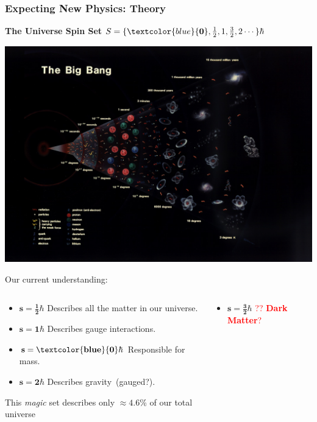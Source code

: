 \documentclass{beamer}
\begin{document}
\begin{frame}
\frametitle{Expecting New Physics: Theory}
  \begin{minipage}[b]{0.75\linewidth}
    \begin{multicols}{2}
     \begin{varblock}[3.5cm]{\textbf{The Universe  Spin Set}}
     \huge{
       $S =\{\textcolor{blue}{\mathbf{0}}, \frac{1}{2}, 1,  \frac{3}{2}, 2  \cdots \} \hbar $ 
       }
     \end{varblock}
     \columnbreak
     \includegraphics[height=0.45\textwidth,width=0.40\paperwidth]{THESISPLOTS/New-Physics-PLOTS/Big_Bang.jpg}
 \end{multicols}
 \end{minipage}
\begin{minipage}[b]{\linewidth}
Our current understanding:
 \begin{columns}
    \begin{column}{0.65\linewidth} 
     \begin{itemize}
     \item $\mathbf{s = \frac{1}{2}\hbar}$ Describes all the matter in our universe.
     \item $\mathbf{s = 1\hbar}$ Describes gauge interactions.
     \item $\mathbf{s = \textcolor{blue}{0}\hbar}$ Responsible for mass.
     \item $\mathbf{s = 2\hbar}$ Describes gravity~(gauged?).
    \end{itemize}
    This \textit{magic} set describes  only $\approx 4.6$\% of our total universe
   \end{column}
     \begin{column}{0.35\linewidth}
      \begin{itemize}
       \item $\mathbf{s = \frac{3}{2}\hbar}$ \textcolor{red}{?? \textbf{Dark Matter}?}

\end{itemize}
\end{column}
\end{columns}
\end{minipage}
\end{frame}
\end{document}
